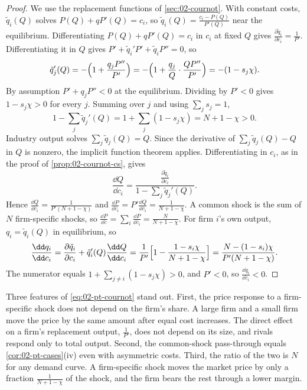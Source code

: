 \begin{proof}
We use the replacement functions of \cref{sec:02-cournot}. With constant costs, $\tilde q_i(Q)$ solves
$P(Q) + qP'(Q) = c_i$, so $\tilde q_i(Q) = \frac{c_i - P(Q)}{P'(Q)}$ near the equilibrium. Differentiating
$P(Q) + qP'(Q) = c_i$ in $c_i$ at fixed $Q$ gives $\frac{\partial\tilde q_i}{\partial c_i} = \frac{1}{P'}$.
Differentiating it in $Q$ gives $P' + \tilde q_i'P' + \tilde q_iP'' = 0$, so
\begin{equation*}
\tilde q_j'(Q) = -\Bigl(1 + \frac{q_jP''}{P'}\Bigr) = -\Bigl(1 + \frac{q_j}{Q}\cdot\frac{QP''}{P'}\Bigr)
= -(1 - s_j\chi) .
\end{equation*}
By assumption $P' + q_jP'' < 0$ at the equilibrium. Dividing by $P' < 0$ gives $1 - s_j\chi > 0$ for every $j$.
Summing over $j$ and using $\sum_j s_j = 1$,
\begin{equation*}
1 - \sum_j \tilde q_j'(Q) = 1 + \sum_j (1 - s_j\chi) = N + 1 - \chi > 0 .
\end{equation*}
Industry output solves $\sum_j \tilde q_j(Q) = Q$. Since the derivative of $\sum_j \tilde q_j(Q) - Q$ in $Q$ is
nonzero, the implicit function theorem applies. Differentiating in $c_i$, as in the proof of
\cref{prop:02-cournot-cs}, gives
\begin{equation*}
\frac{\dd Q}{\dd c_i} = \frac{\frac{\partial\tilde q_i}{\partial c_i}}{1 - \sum_j \tilde q_j'(Q)} .
\end{equation*}
Hence $\frac{\dd Q}{\dd c_i} = \frac{1}{P'(N + 1 - \chi)}$ and $\frac{\dd P}{\dd c_i} = P'\frac{\dd Q}{\dd c_i} = \frac{1}{N + 1 - \chi}$.
A common shock is the sum of $N$ firm-specific shocks, so $\frac{\dd P}{\dd c} = \sum_i\frac{\dd P}{\dd c_i} = \frac{N}{N + 1 - \chi}$.
For firm $i$'s own output, $q_i = \tilde q_i(Q)$ in equilibrium, so
\begin{equation*}
\frac{\dd q_i}{\dd c_i} = \frac{\partial\tilde q_i}{\partial c_i} + \tilde q_i'(Q)\frac{\dd Q}{\dd c_i}
= \frac{1}{P'}\Bigl[1 - \frac{1 - s_i\chi}{N + 1 - \chi}\Bigr]
= \frac{N - (1 - s_i)\chi}{P'(N + 1 - \chi)} .
\end{equation*}
The numerator equals $1 + \sum_{j \ne i}(1 - s_j\chi) > 0$, and $P' < 0$, so $\frac{\dd q_i}{\dd c_i} < 0$.
\end{proof}

Three features of \eqref{eq:02-pt-cournot} stand out. First, the price response to a firm-specific shock does
not depend on the firm's share. A large firm and a small firm move the price by the same amount after equal
cost increases. The direct effect on a firm's replacement output, $\frac{1}{P'}$, does not depend on its size, and
rivals respond only to total output. Second, the
common-shock pass-through equals \cref{cor:02-pt-cases}(iv) even with asymmetric costs. Third, the ratio of the
two is $N$ for any demand curve. A firm-specific shock moves the market price by only a fraction
$\frac{1}{N + 1 - \chi}$ of the shock, and the firm bears the rest through a lower margin.

